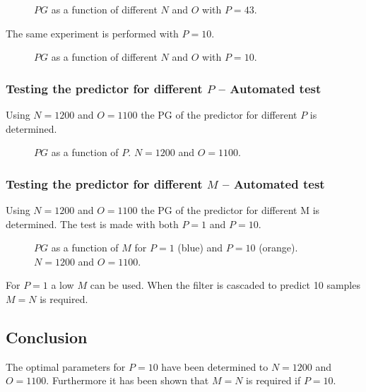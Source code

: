 \begin{figure}[H]
	\centering
	
	\caption{$PG$ as a function of different $N$ and $O$ with $P=43$.}
	\label{fig:Predict43App}
\end{figure}

The same experiment is performed with $P=10$.
\begin{figure}[H]
	\centering
	
	\caption{$PG$ as a function of different $N$ and $O$ with $P=10$.}
	\label{fig:Predict10App}
\end{figure}


\subsubsection{Testing the predictor for different $P$ -- Automated test}
Using $N=1200$ and $O=1100$ the PG of the predictor for different $P$ is determined. 
\begin{figure}[H]
	\centering
	
	\caption{$PG$ as a function of $P$. $N=1200$ and $O=1100$.}
	\label{fig:PredictPApp}
\end{figure}

\subsubsection{Testing the predictor for different $M$ -- Automated test}
Using $N=1200$ and $O=1100$ the PG of the predictor for different M is determined. The test is made with both $P=1$ and $P=10$. 
\begin{figure}[H]
	\centering
	
	\caption{$PG$ as a function of $M$ for $P=1$ (blue) and $P=10$ (orange).  $N=1200$ and $O=1100$.}
	\label{fig:PredictMApp}
\end{figure}
For $P=1$ a low $M$ can be used. When the filter is cascaded to predict 10 samples $M=N$ is required. 

\subsection{Conclusion}
The optimal parameters for $P=10$ have been determined to $N=1200$ and $O=1100$. Furthermore it has been shown that $M=N$ is required if $P=10$. 
